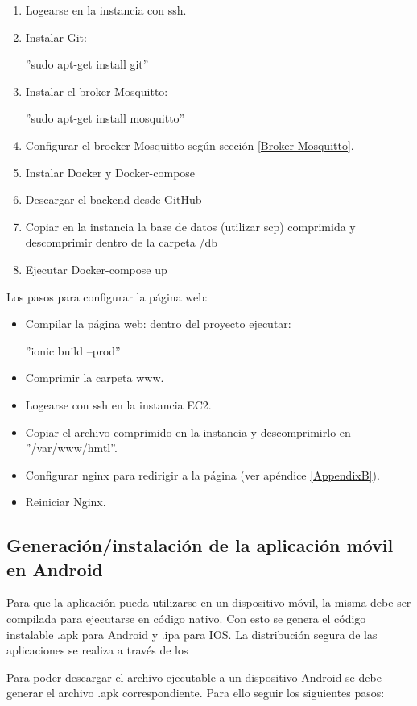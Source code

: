 \begin{enumerate}


\item Logearse en la instancia con ssh.
\item Instalar Git:

	''sudo apt-get install git''
\item Instalar el broker Mosquitto:
	
	''sudo apt-get install mosquitto''
\item Configurar el brocker Mosquitto según sección \ref{Broker Mosquitto}.
\item Instalar Docker y Docker-compose
\item Descargar el backend desde GitHub
\item Copiar en la instancia la base de datos (utilizar scp) comprimida y descomprimir dentro de la carpeta /db
\item Ejecutar Docker-compose up
\end{enumerate}

Los pasos para configurar la página web:
\begin{itemize}
\item Compilar la página web: dentro del proyecto ejecutar:

''ionic build --prod''
\item Comprimir la carpeta www.
\item Logearse con ssh en la instancia EC2.
\item Copiar el archivo comprimido en la instancia y descomprimirlo en ''/var/www/hmtl''.
\item Configurar nginx para redirigir a la página (ver apéndice \ref{AppendixB}).
\item Reiniciar Nginx.

\end{itemize}
\subsection{Generación/instalación de la aplicación móvil en Android}

Para que la aplicación pueda utilizarse en un dispositivo móvil, la misma debe ser compilada para ejecutarse en código nativo. Con esto se genera el código instalable .apk para Android y .ipa para IOS. La distribución segura de las aplicaciones se realiza a través de los  

Para poder descargar el archivo ejecutable a un dispositivo Android se debe generar el archivo .apk correspondiente. Para ello seguir los siguientes pasos:

